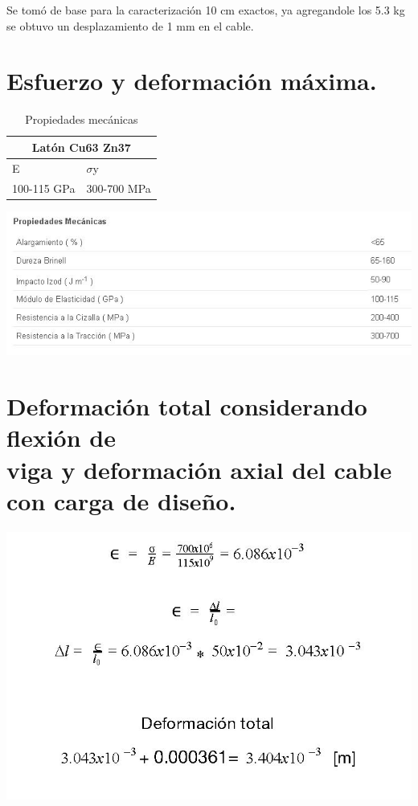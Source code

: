 \textrm{Se tomó de base para la caracterización 10 cm exactos, ya agregandole los 5.3 kg se obtuvo un desplazamiento de 1 mm en el cable.}


\section{Esfuerzo y deformación máxima.}

\begin{table}[htb]
\centering
\begin{tabular}{| p{2.8cm}| p{2.8cm} |}
\hline
\multicolumn{2}{|c|}{Latón Cu63 Zn37} \\
\hline
E &  $\sigma$y \\
\hline \hline
100-115 GPa & 300-700 MPa  \\ \hline
\end{tabular}
\caption{Propiedades mecánicas}
\label{}
\end{table}

\begin{center}
\includegraphics[width=1\linewidth]{C/figs/B_1.jpg} 
\end{center}


\section{Deformación total considerando flexión de \\viga y deformación axial del cable con carga de diseño.}
\begin{center}
\includegraphics[width=.8\linewidth]{C/figs/B_2.jpg} 
\end{center}

